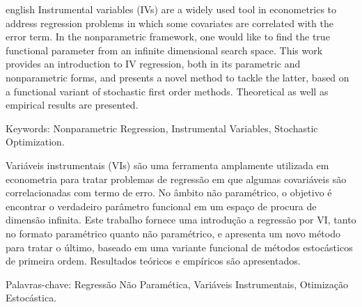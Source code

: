 \setlength{\absparsep}{18pt} 

\begin{resumo}[Abstract]
 \begin{otherlanguage*}{english}
     Instrumental variables (IVs) are a widely used tool in econometrics to address regression problems in which some covariates are correlated with the error term.
     In the nonparametric framework, one would like to find the true functional parameter from an infinite dimensional search space.
     This work provides an introduction to IV regression, both in its parametric and nonparametric forms, and presents a novel method to tackle the latter, based on a functional variant of stochastic first order methods.
     Theoretical as well as empirical results are presented.
 \end{otherlanguage*}

 Keywords: Nonparametric Regression, Instrumental Variables, Stochastic Optimization.
\end{resumo}

\begin{resumo}[Resumo]
    Variáveis instrumentais (VIs) são uma ferramenta amplamente utilizada em econometria para tratar problemas de regressão em que algumas covariáveis são correlacionadas com termo de erro.
    No âmbito não paramétrico, o objetivo é encontrar o verdadeiro parâmetro funcional em um espaço de procura de dimensão infinita.
    Este trabalho fornece uma introdução a regressão por VI, tanto no formato paramétrico quanto não paramétrico, e apresenta um novo método para tratar o último, baseado em uma variante funcional de métodos estocásticos de primeira ordem.
    Resultados teóricos e empíricos são apresentados.

    Palavras-chave: Regressão Não Paramética, Variáveis Instrumentais, Otimização Estocástica.
\end{resumo}
